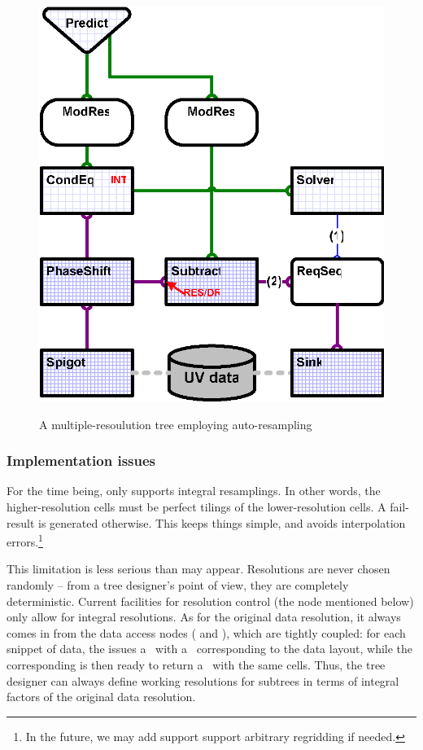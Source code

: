   \begin{figure}[th]
  \begin{center}
  \includegraphics[width=.5\textwidth]{Figures/SolveMultiRes.eps}\\
  \end{center}
  \caption{\label{fig:resample}A multiple-resoulution tree employing
  auto-resampling}
  \end{figure}

\subsubsection{Implementation issues}

  For the time being,  only supports integral resamplings. In other
  words, the higher-resolution cells must be perfect tilings of the
  lower-resolution cells. A fail-result is generated otherwise. This keeps
  things simple, and avoids interpolation errors.\footnote{In the future, we
  may add support support arbitrary regridding if needed.} 

  This limitation is less serious than may appear. Resolutions are never chosen
  randomly -- from a tree designer's point of view, they are completely
  deterministic. Current facilities for resolution control (the 
  node mentioned below) only allow for integral resolutions. As for the
  original data resolution, it always comes in from the data access nodes
  ( and ), which are tightly coupled: for each snippet of
  data, the  issues a \Request\ with a \Cells\ corresponding to the
  data layout, while the corresponding  is then ready to return a
  \Result\ with the same cells. Thus, the tree designer can always define
  working resolutions for subtrees in terms of integral factors of the original
  data resolution.
  
